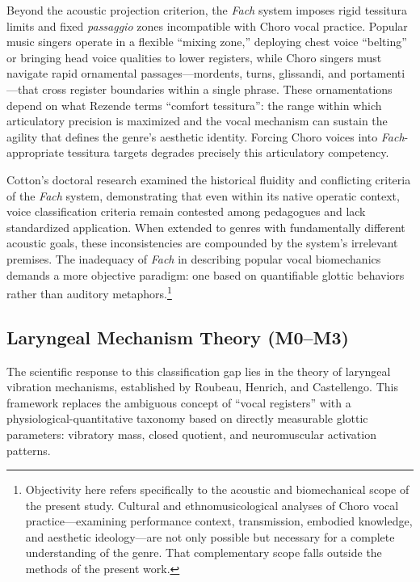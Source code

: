 \documentclass[review,3p,number]{elsarticle}
\begin{document}
Beyond the acoustic projection criterion, the \emph{Fach} system imposes rigid
tessitura limits and fixed \emph{passaggio} zones incompatible with Choro vocal
practice. Popular music singers operate in a flexible ``mixing zone,'' deploying
chest voice ``belting'' or bringing head voice qualities to lower
registers,\cite{bourne2012} while Choro singers must navigate rapid ornamental
passages---mordents, turns, glissandi, and portamenti---that cross register
boundaries within a single phrase. These ornamentations depend on what Rezende
terms ``comfort tessitura'': the range within which articulatory precision is
maximized and the vocal mechanism can sustain the agility that defines the genre's
aesthetic identity.\cite{rezende2016} Forcing Choro voices into
\emph{Fach}-appropriate tessitura targets degrades precisely this articulatory
competency.

Cotton's doctoral research\cite{cotton2007} examined the historical fluidity and
conflicting criteria of the \emph{Fach} system, demonstrating that even within its
native operatic context, voice classification criteria remain contested among
pedagogues and lack standardized application. When extended to genres with fundamentally different acoustic goals, these
inconsistencies are compounded by the system's irrelevant premises. The inadequacy of
\emph{Fach} in describing popular vocal biomechanics demands a more objective
paradigm: one based on quantifiable glottic behaviors rather than auditory
metaphors.\footnote{Objectivity here refers specifically to the acoustic and
biomechanical scope of the present study. Cultural and ethnomusicological
analyses of Choro vocal practice---examining performance context, transmission,
embodied knowledge, and aesthetic ideology---are not only possible but
necessary for a complete understanding of the genre. That complementary scope
falls outside the methods of the present work.}

\subsection{Laryngeal Mechanism Theory (M0--M3)}
\label{sec:mechanisms}

The scientific response to this classification gap lies in the theory of laryngeal
vibration mechanisms, established by Roubeau, Henrich, and
Castellengo.\cite{roubeau2009} This framework replaces the ambiguous concept of
``vocal registers'' with a physiological-quantitative taxonomy based on directly
measurable glottic parameters: vibratory mass, closed quotient, and neuromuscular
activation patterns.
\end{document}
